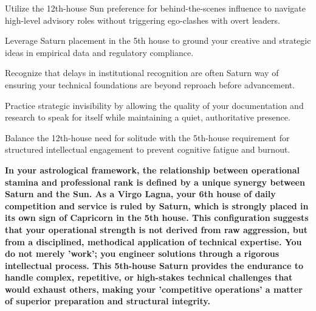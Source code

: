 \begin{diamondlist}
  \item {\fontsize{8.5}{12}\selectfont Utilize the 12th-house Sun preference for behind-the-scenes influence to navigate high-level advisory roles without triggering ego-clashes with overt leaders.}
  \item {\fontsize{8.5}{12}\selectfont Leverage Saturn placement in the 5th house to ground your creative and strategic ideas in empirical data and regulatory compliance.}
  \item {\fontsize{8.5}{12}\selectfont Recognize that delays in institutional recognition are often Saturn way of ensuring your technical foundations are beyond reproach before advancement.}
  \item {\fontsize{8.5}{12}\selectfont Practice strategic invisibility by allowing the quality of your documentation and research to speak for itself while maintaining a quiet, authoritative presence.}
  \item {\fontsize{8.5}{12}\selectfont Balance the 12th-house need for solitude with the 5th-house requirement for structured intellectual engagement to prevent cognitive fatigue and burnout.}
\end{diamondlist}


\label{topic46}

{\fontsize{9.5}{13.8}\selectfont\bfseries\color{DeepSlate} In your astrological framework, the relationship between operational stamina and professional rank is defined by a unique synergy between Saturn and the Sun. As a Virgo Lagna, your 6th house of daily competition and service is ruled by Saturn, which is strongly placed in its own sign of Capricorn in the 5th house. This configuration suggests that your operational strength is not derived from raw aggression, but from a disciplined, methodical application of technical expertise. You do not merely 'work'; you engineer solutions through a rigorous intellectual process. This 5th-house Saturn provides the endurance to handle complex, repetitive, or high-stakes technical challenges that would exhaust others, making your 'competitive operations' a matter of superior preparation and structural integrity.}\par\vspace{2mm}

